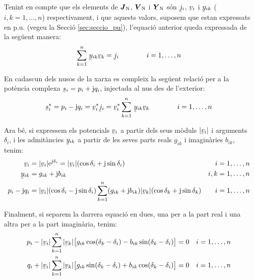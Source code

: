 Tenint en compte que els elements de $\mcmplx{J}\ped{N}$,
$\mcmplx{V}\ped{N}$ i $\mcmplx{Y}\ped{N}$ s\'{o}n $\cmplx{j}_i$,
$\cmplx{v}_i$ i  $\cmplx{y}_{ik}$ ($i,k=1,\ldots,n$) respectivament,
i que aquests valors, suposem que estan expressats en p.u. (vegeu la
Secci\'{o} \ref{sec:seccio_pu}), l'equaci\'{o} anterior queda expressada de
la seg\"{u}ent manera:
\begin{equation}
    \sum^n_{k=1}\, \cmplx{y}_{ik} \cmplx{v}_k = \cmplx{j}_i \qquad\qquad i=1,\ldots,n
\end{equation}

En cadascun dels nusos de la xarxa es compleix la seg\"{u}ent relaci\'{o}
per a la pot\`{e}ncia complexa $\cmplx{s}_i = p_i + \ju q_i$, injectada
al nus des de l'exterior:
\begin{equation}
    \cmplx{s}_i^* = p_i - \ju q_i = \cmplx{v}_i^* \cmplx{j}_i = \cmplx{v}_i^*
    \sum^n_{k=1}\, \cmplx{y}_{ik} \cmplx{v}_k \qquad\qquad i=1,\ldots,n \label{eq:sconj}
\end{equation}

Ara b\'{e}, si expressem els potencials $\cmplx{v}_i$ a partir dels seus m\`{o}duls $|\cmplx{v}_i|$
i arguments $\delta_i$, i les admit\`{a}ncies $\cmplx{y}_{ik}$ a partir de les seves parts
reals $g_{ik}$ i imagin\`{a}ries $b_{ik}$, tenim:
\begin{align}
    \cmplx{v}_i &=|\cmplx{v}_i| \eu^{\ju\delta_i} = |\cmplx{v}_i|
    (\cos\delta_i+\ju\sin\delta_i) & i & =1,\ldots,n\\
    \cmplx{y}_{ik} &= g_{ik} + \ju b_{ik} & i,k & =1,\ldots,n \\
    p_i - \ju q_i &= |\cmplx{v}_i| (\cos\delta_i - \ju\sin\delta_i) \sum^n_{k=1} (g_{ik} + \ju
    b_{ik}) |\cmplx{v}_k| (\cos\delta_k + \ju\sin\delta_k) & i & =1,\ldots,n
\end{align}

Finalment, si separem la darrera equaci\'{o} en dues, una per a  la part real i  una altra per
a la part imagin\`{a}ria, tenim:
\begin{align}
    p_i - |\cmplx{v}_i| \sum^n_{k=1}  |\cmplx{v}_k| \bigl[ g_{ik} \cos(\delta_k - \delta_i) -
     b_{ik} \sin(\delta_k - \delta_i) \bigr] &= 0  & i&=1,\ldots,n\label{eq:p0} \\
    q_i + |\cmplx{v}_i| \sum^n_{k=1}  |\cmplx{v}_k| \bigl[ g_{ik} \sin(\delta_k - \delta_i) +
      b_{ik} \cos(\delta_k - \delta_i) \bigr] &= 0 & i&=1,\ldots,n\label{eq:q0}
\end{align}

